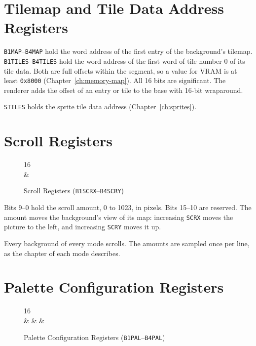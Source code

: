 \section{Tilemap and Tile Data Address Registers}

\texttt{B1MAP}--\texttt{B4MAP} hold the word address of the first entry of the background's tilemap. \texttt{B1TILES}--\texttt{B4TILES}
hold the word address of the first word of tile number 0 of its tile data. Both are full offsets within the segment, so
a value for VRAM is at least \texttt{0x8000} (Chapter~\ref{ch:memory-map}). All 16 bits are significant. The renderer
adds the offset of an entry or tile to the base with 16-bit wraparound.

\texttt{STILES} holds the sprite tile data address (Chapter~\ref{ch:sprites}).

\section{Scroll Registers}

\begin{figure}[H]
	\centering
	\begin{bytefield}[bitwidth=2em]{16}
		 \\
		 &
	\end{bytefield}
	\caption{Scroll Registers (\texttt{B1SCRX}--\texttt{B4SCRY})}
	\label{fig:reg-scroll}
\end{figure}

Bits 9--0 hold the scroll amount, 0 to 1023, in pixels. Bits 15--10 are reserved. The amount moves the background's
view of its map: increasing \texttt{SCRX} moves the picture to the left, and increasing \texttt{SCRY} moves it up.

Every background of every mode scrolls. The amounts are sampled once per line, as the chapter of each mode describes.

\section{Palette Configuration Registers}
\label{sec:reg-palette}

\begin{figure}[H]
	\centering
	\begin{bytefield}[bitwidth=2em]{16}
		 \\
		 &
		 &
		 &
	\end{bytefield}
	\caption{Palette Configuration Registers (\texttt{B1PAL}--\texttt{B4PAL})}
	\label{fig:reg-pal}
\end{figure}

